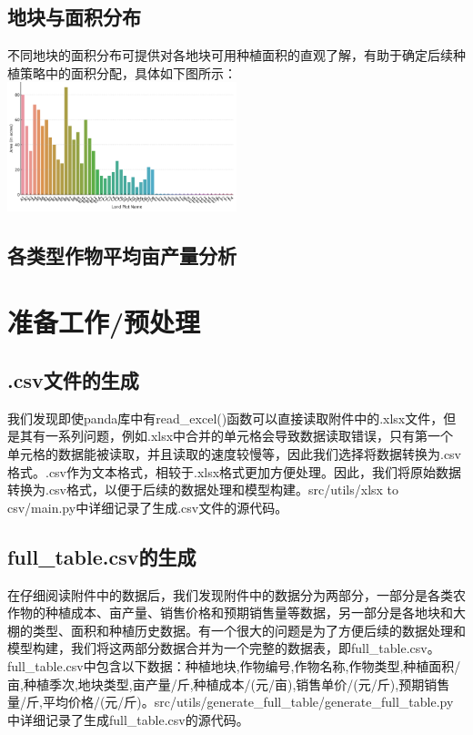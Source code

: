 \documentclass{cumcmthesis}
\begin{document}
\subsection{地块与面积分布}
不同地块的面积分布可提供对各地块可用种植面积的直观了解，有助于确定后续种植策略中的面积分配，具体如下图所示：
\includegraphics[width=0.5\textwidth]{image.png}


\subsection{各类型作物平均亩产量分析}

\section{准备工作/预处理}
\subsection{.csv文件的生成}
我们发现即使panda库中有read\_excel()函数可以直接读取附件中的.xlsx文件，但是其有一系列问题，例如.xlsx中合并的单元格会导致数据读取错误，只有第一个单元格的数据能被读取，并且读取的速度较慢等，因此我们选择将数据转换为.csv格式。.csv作为文本格式，相较于.xlsx格式更加方便处理。因此，我们将原始数据转换为.csv格式，以便于后续的数据处理和模型构建。src/utils/xlsx to csv/main.py中详细记录了生成.csv文件的源代码。

\subsection{full\_table.csv的生成}
在仔细阅读附件中的数据后，我们发现附件中的数据分为两部分，一部分是各类农作物的种植成本、亩产量、销售价格和预期销售量等数据，另一部分是各地块和大棚的类型、面积和种植历史数据。有一个很大的问题是为了方便后续的数据处理和模型构建，我们将这两部分数据合并为一个完整的数据表，即full\_table.csv。full\_table.csv中包含以下数据：种植地块,作物编号,作物名称,作物类型,种植面积/亩,种植季次,地块类型,亩产量/斤,种植成本/(元/亩),销售单价/(元/斤),预期销售量/斤,平均价格/(元/斤)。src/utils/generate\_full\_table/generate\_full\_table.py中详细记录了生成full\_table.csv的源代码。
\end{document}
